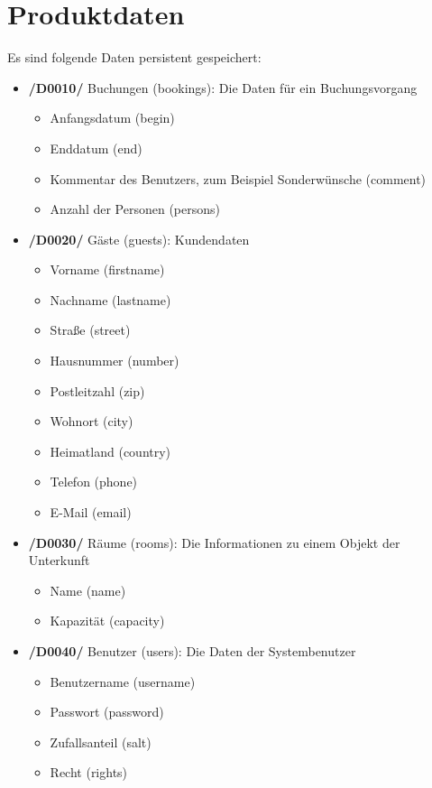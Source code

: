 \documentclass[a4paper,oneside]{scrreprt}
\begin{document}
\chapter{Produktdaten}
Es sind folgende Daten persistent gespeichert:

\begin{itemize}
\item \textbf{/D0010/} Buchungen (bookings): Die Daten für ein Buchungsvorgang
    \begin{itemize}
    \item Anfangsdatum (begin)
    \item Enddatum (end)
    \item Kommentar des Benutzers, zum Beispiel Sonderwünsche (comment)
    \item Anzahl der Personen (persons)
    \end{itemize}

\item \textbf{/D0020/} Gäste (guests): Kundendaten
    \begin{itemize}
    \item Vorname (firstname)
    \item Nachname (lastname)
    \item Straße (street)
    \item Hausnummer (number)
    \item Postleitzahl (zip)
    \item Wohnort (city)
    \item Heimatland (country)
    \item Telefon (phone)
    \item E-Mail (email)
    \end{itemize}

\item \textbf{/D0030/} Räume (rooms): Die Informationen zu einem Objekt der Unterkunft
    \begin{itemize}
    \item Name (name)
    \item Kapazität (capacity)
    \end{itemize}

\item \textbf{/D0040/} Benutzer (users): Die Daten der Systembenutzer
    \begin{itemize}
    \item Benutzername (username)
    \item Passwort (password)
    \item Zufallsanteil (salt)
    \item Recht (rights)
    \end{itemize}
\end{itemize}
\end{document}
